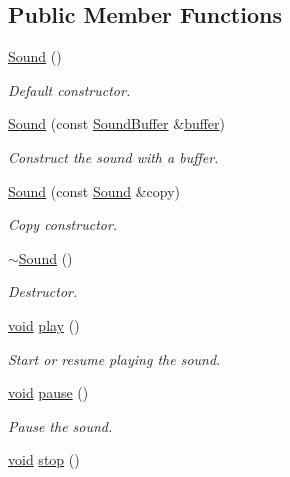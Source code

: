 \subsection*{Public Member Functions}
\begin{DoxyCompactItemize}
\item 
\hyperlink{classsf_1_1_sound_a36ab74beaaa953d9879c933ddd246282}{Sound} ()
\begin{DoxyCompactList}\small\item\em Default constructor. \end{DoxyCompactList}\item 
\hyperlink{classsf_1_1_sound_a3b1cfc19a856d4ff8c079ee41bb78e69}{Sound} (const \hyperlink{classsf_1_1_sound_buffer}{Sound\-Buffer} \&\hyperlink{gl3_8h_a7fc54503e1a1cf98d128b839ebc0b4d0}{buffer})
\begin{DoxyCompactList}\small\item\em Construct the sound with a buffer. \end{DoxyCompactList}\item 
\hyperlink{classsf_1_1_sound_ae05eeed6377932694d86b3011be366c0}{Sound} (const \hyperlink{classsf_1_1_sound}{Sound} \&copy)
\begin{DoxyCompactList}\small\item\em Copy constructor. \end{DoxyCompactList}\item 
\hyperlink{classsf_1_1_sound_ad0792c35310eba2dffd8489c80fad076}{$\sim$\-Sound} ()
\begin{DoxyCompactList}\small\item\em Destructor. \end{DoxyCompactList}\item 
\hyperlink{glutf90_8h_ac778d6f63f1aaf8ebda0ce6ac821b56e}{void} \hyperlink{classsf_1_1_sound_a2953ffe632536e72e696fd880ced2532}{play} ()
\begin{DoxyCompactList}\small\item\em Start or resume playing the sound. \end{DoxyCompactList}\item 
\hyperlink{glutf90_8h_ac778d6f63f1aaf8ebda0ce6ac821b56e}{void} \hyperlink{classsf_1_1_sound_a5eeb25815bfa8cdc4a6cc000b7b19ad5}{pause} ()
\begin{DoxyCompactList}\small\item\em Pause the sound. \end{DoxyCompactList}\item 
\hyperlink{glutf90_8h_ac778d6f63f1aaf8ebda0ce6ac821b56e}{void} \hyperlink{classsf_1_1_sound_aa9c91c34f7c6d344d5ee9b997511f754}{stop} ()

\end{DoxyCompactItemize}
